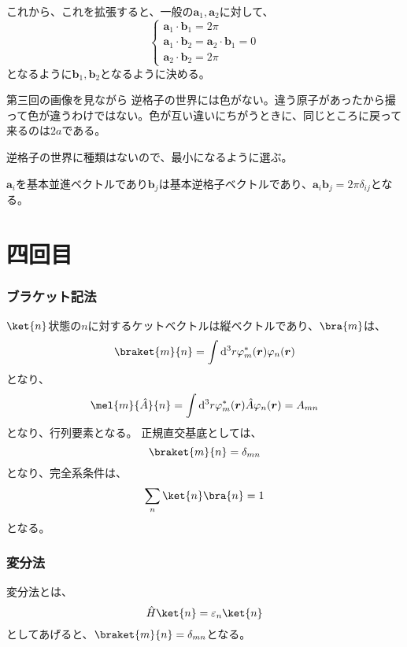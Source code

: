 \documentclass[titlepage]{ltjsarticle}
\begin{document}
これから、これを拡張すると、一般の\(\bm{a}_1,\bm{a}_2\)に対して、
\begin{equation}
  \begin{cases}
    \bm{a}_1 \cdot \bm{b}_1 = 2 \pi \\
    \bm{a}_1 \cdot \bm{b}_2 =\bm{a}_2 \cdot \bm{b}_1 =0 \\
    \bm{a}_2 \cdot \bm{b}_2 = 2 \pi
  \end{cases}
\end{equation}
となるように\(\bm{b}_1,\bm{b}_2\)となるように決める。

第三回の画像を見ながら
逆格子の世界には色がない。違う原子があったから撮って色が違うわけではない。色が互い違いにちがうときに、同じところに戻って来るのは\(2a\)である。

逆格子の世界に種類はないので、最小になるように選ぶ。

\(\bm{a}_i\)を基本並進ベクトルであり\(\bm{b}_j\)は基本逆格子ベクトルであり、\(\bm{a}_i \bm{b}_j=2\pi \delta_{ij}\)となる。

\section{四回目}

\subsubsection{ブラケット記法}
\(\ket{n}\)状態の\(n\)に対するケットベクトルは縦ベクトルであり、\(\bra{m}\)は、
\begin{equation}
  \braket{m}{n} = \int \odif[order=3]{r} \varphi_m^*(\bm{r})\varphi_n(\bm{r})
\end{equation}
となり、
\begin{equation}
  \mel{m}{\hat{A}}{n} = \int \odif[order=3]{r} \varphi_m^*(\bm{r})\hat{A}\varphi_n(\bm{r}) = A_{mn}
\end{equation}
となり、行列要素となる。
正規直交基底としては、
\begin{equation}
  \braket{m}{n} = \delta_{mn}
\end{equation}
となり、完全系条件は、
\begin{equation}
  \sum_{n} \ket{n}\bra{n} = 1
\end{equation}
となる。

\subsubsection{変分法}
変分法とは、
\begin{equation}
  \hat{H} \ket{n} = \varepsilon_n \ket{n}
\end{equation}
としてあげると、\(\braket{m}{n} = \delta_{mn}\)となる。
\end{document}
